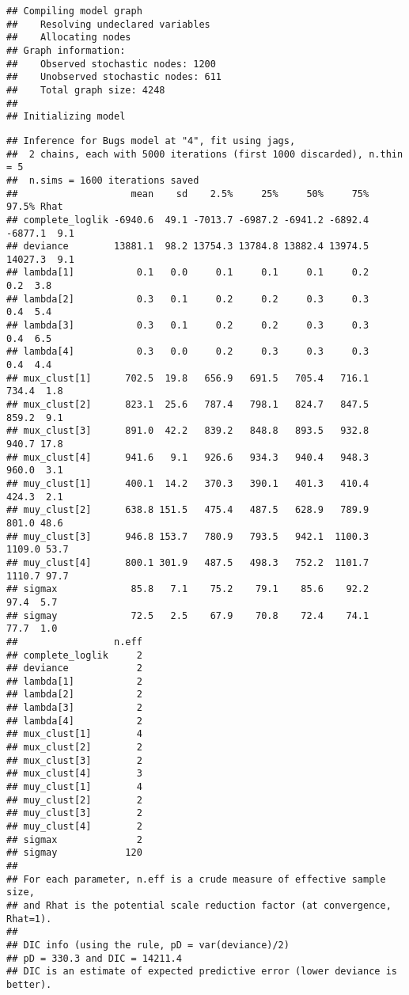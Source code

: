\documentclass[
  oneside]{book}
\newenvironment{Shaded}{\begin{snugshade}}{\end{snugshade}}
\newcommand{\NormalTok}[1]{#1}
\newcommand{\SpecialCharTok}[1]{\textcolor[rgb]{0.00,0.00,0.00}{#1}}
\begin{document}
\begin{verbatim}
## Compiling model graph
##    Resolving undeclared variables
##    Allocating nodes
## Graph information:
##    Observed stochastic nodes: 1200
##    Unobserved stochastic nodes: 611
##    Total graph size: 4248
## 
## Initializing model
\end{verbatim}

\begin{Shaded}
\end{Shaded}

\begin{verbatim}
## Inference for Bugs model at "4", fit using jags,
##  2 chains, each with 5000 iterations (first 1000 discarded), n.thin = 5
##  n.sims = 1600 iterations saved
##                    mean    sd    2.5%     25%     50%     75%   97.5% Rhat
## complete_loglik -6940.6  49.1 -7013.7 -6987.2 -6941.2 -6892.4 -6877.1  9.1
## deviance        13881.1  98.2 13754.3 13784.8 13882.4 13974.5 14027.3  9.1
## lambda[1]           0.1   0.0     0.1     0.1     0.1     0.2     0.2  3.8
## lambda[2]           0.3   0.1     0.2     0.2     0.3     0.3     0.4  5.4
## lambda[3]           0.3   0.1     0.2     0.2     0.3     0.3     0.4  6.5
## lambda[4]           0.3   0.0     0.2     0.3     0.3     0.3     0.4  4.4
## mux_clust[1]      702.5  19.8   656.9   691.5   705.4   716.1   734.4  1.8
## mux_clust[2]      823.1  25.6   787.4   798.1   824.7   847.5   859.2  9.1
## mux_clust[3]      891.0  42.2   839.2   848.8   893.5   932.8   940.7 17.8
## mux_clust[4]      941.6   9.1   926.6   934.3   940.4   948.3   960.0  3.1
## muy_clust[1]      400.1  14.2   370.3   390.1   401.3   410.4   424.3  2.1
## muy_clust[2]      638.8 151.5   475.4   487.5   628.9   789.9   801.0 48.6
## muy_clust[3]      946.8 153.7   780.9   793.5   942.1  1100.3  1109.0 53.7
## muy_clust[4]      800.1 301.9   487.5   498.3   752.2  1101.7  1110.7 97.7
## sigmax             85.8   7.1    75.2    79.1    85.6    92.2    97.4  5.7
## sigmay             72.5   2.5    67.9    70.8    72.4    74.1    77.7  1.0
##                 n.eff
## complete_loglik     2
## deviance            2
## lambda[1]           2
## lambda[2]           2
## lambda[3]           2
## lambda[4]           2
## mux_clust[1]        4
## mux_clust[2]        2
## mux_clust[3]        2
## mux_clust[4]        3
## muy_clust[1]        4
## muy_clust[2]        2
## muy_clust[3]        2
## muy_clust[4]        2
## sigmax              2
## sigmay            120
## 
## For each parameter, n.eff is a crude measure of effective sample size,
## and Rhat is the potential scale reduction factor (at convergence, Rhat=1).
## 
## DIC info (using the rule, pD = var(deviance)/2)
## pD = 330.3 and DIC = 14211.4
## DIC is an estimate of expected predictive error (lower deviance is better).
\end{verbatim}
\end{document}
